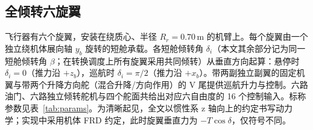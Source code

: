\documentclass[UTF8,a4paper,11pt]{ctexart}
\newcommand{\SI}[2]{\ensuremath{#1\,#2}}
\newcommand{\meter}{\mathrm{m}}
\begin{document}
\subsection{全倾转六旋翼}\label{sec:config}
飞行器有六个旋翼，安装在绕质心、半径 $R_r=\SI{0.70}{\meter}$ 的机臂上。每个旋翼由一个独立绕机体展向轴 $y_b$ 旋转的短舱承载。各短舱倾转角 $\delta_i$（本文其余部分记为同一短舱倾转角 $\beta$；在转换调度上所有旋翼采用共同倾转）从垂直方向起算：悬停时 $\delta_i=0$（推力沿 $+z_b$），巡航时 $\delta_i=\pi/2$（推力沿 $+x_b$）。带两副独立副翼的固定机翼与带两个升降方向舵（混合升降/方向作用）的 V 尾提供巡航升力与控制。六路油门、六路独立倾转舵机与四个舵面共给出对应六自由度的 16 个控制输入。标称参数见表~\ref{tab:params}。为清晰起见，全文以惯性系 z 轴向上的约定书写动力学；实现中采用机体 FRD 约定，此时旋翼垂直力为 $-T\cos\delta$，仅符号不同。
\end{document}
